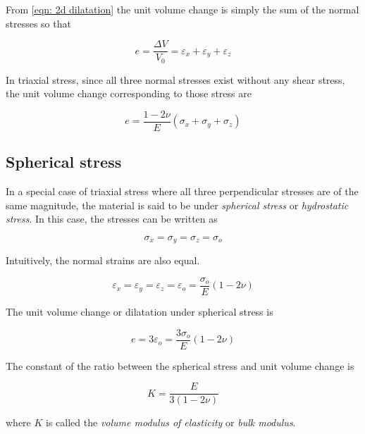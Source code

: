 \documentclass[
10pt,
a4paper,
openany,
svgnames,
]{book} %
\begin{document}
From \cref{eqn: 2d dilatation} the unit volume change is simply the sum of the normal stresses so that

\begin{equation}
  e = \frac{\Delta V}{V_0} = \varepsilon_x + \varepsilon_y + \varepsilon _z
\end{equation}

In triaxial stress, since all three normal stresses exist without any shear stress, the unit volume change corresponding to those stress are

\begin{equation}
  e = \frac{1 - 2\nu}{E}(\sigma_x + \sigma_y + \sigma_z)
\end{equation}

\subsection{Spherical stress}

In a special case of triaxial stress where all three perpendicular stresses are of the same magnitude, the material is said to be under \emph{spherical stress} or \emph{hydrostatic stress}. In this case, the stresses can be written as

\[\sigma_x = \sigma_y = \sigma_z = \sigma_o\]

Intuitively, the normal strains are also equal.

\[\varepsilon _x = \varepsilon _y = \varepsilon _z = \varepsilon _o = \frac{\sigma _o}{E}(1 - 2\nu )\]

The unit volume change or dilatation under spherical stress is

\begin{equation}
  e = 3\varepsilon_o = \frac{3\sigma_o}{E}(1 - 2\nu )
\end{equation}

The constant of the ratio between the spherical stress and unit volume change is

\begin{equation}
  K = \frac{E}{3(1 - 2\nu )}
\end{equation}

where $K$ is called the \emph{volume modulus of elasticity} or \emph{bulk modulus}.
\end{document}
